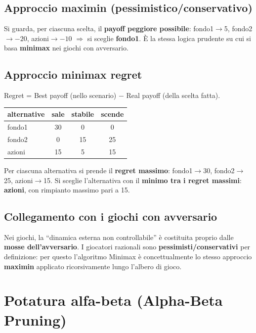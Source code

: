 \documentclass[11pt,a4paper]{report}
\begin{document}
\subsection*{Approccio maximin (pessimistico/conservativo)}

Si guarda, per ciascuna scelta, il \textbf{payoff peggiore possibile}: fondo1$\to$5, fondo2$\to-20$, azioni$\to-10$ $\Rightarrow$ si sceglie \textbf{fondo1}. È la stessa logica prudente su cui si basa \textbf{minimax} nei giochi con avversario.

\subsection*{Approccio minimax regret}

Regret = Best payoff (nello scenario) $-$ Real payoff (della scelta fatta).

\begin{center}
\begin{tabular}{@{}lccc@{}}
\toprule
\textbf{alternative} & \textbf{sale} & \textbf{stabile} & \textbf{scende} \\
\midrule
fondo1 & 30 & 0 & 0 \\
fondo2 & 0 & 15 & 25 \\
azioni & 15 & 5 & 15 \\
\bottomrule
\end{tabular}
\end{center}

Per ciascuna alternativa si prende il \textbf{regret massimo}: fondo1$\to$30, fondo2$\to$25, azioni$\to$15. Si sceglie l'alternativa con il \textbf{minimo tra i regret massimi}: \textbf{azioni}, con rimpianto massimo pari a 15.

\subsection*{Collegamento con i giochi con avversario}

Nei giochi, la ``dinamica esterna non controllabile'' è costituita proprio dalle \textbf{mosse dell'avversario}. I giocatori razionali sono \textbf{pessimisti/conservativi} per definizione: per questo l'algoritmo Minimax è concettualmente lo stesso approccio \textbf{maximin} applicato ricorsivamente lungo l'albero di gioco.

\section{Potatura alfa-beta (Alpha-Beta Pruning)}
\end{document}
